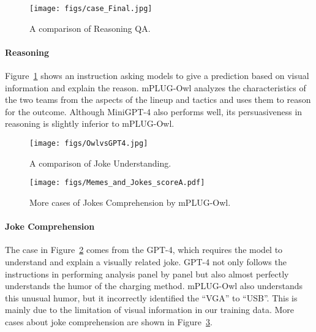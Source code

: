 \documentclass{article}
\newcommand{\modelname}{mPLUG-Owl\xspace}
\begin{document}
\begin{figure}[!ht]
    \centering
    \texttt{[image: figs/case\_Final.jpg]}
    \caption{A comparison of Reasoning QA.}
    \label{fig:case_Final}
    \vspace{-2mm}
\end{figure}

\paragraph{Reasoning}
Figure~\ref{fig:case_Final} shows an instruction asking models to give a prediction based on visual information and explain the reason. 
\modelname analyzes the characteristics of the two teams from the aspects of the lineup and tactics and uses them to reason for the outcome. Although MiniGPT-4 also performs well, its persuasiveness in reasoning is slightly inferior to \modelname.

\begin{figure}[!ht]
    \centering
    \texttt{[image: figs/OwlvsGPT4.jpg]}
    \caption{A comparison of Joke Understanding.}
    \label{fig:case_GPT4}
    \vspace{-2mm}
\end{figure}

\begin{figure}[!ht]
    \centering
    \texttt{[image: figs/Memes\_and\_Jokes\_scoreA.pdf]}
    \caption{More cases of Jokes Comprehension by \modelname.}
    \label{fig:Memes_and_Jokes_scoreA}
    \vspace{-2mm}
\end{figure}



\paragraph{Joke Comprehension}
The case in Figure~\ref{fig:case_GPT4} comes from the GPT-4\citep{gpt4}, which requires the model to understand and explain a visually related joke.
GPT-4 not only follows the instructions in performing analysis panel by panel but also almost perfectly understands the humor of the charging method. \modelname also understands this unusual humor, but it incorrectly identified the ``VGA'' to ``USB''. This is mainly due to the limitation of visual information in our training data. More cases about joke comprehension are shown in Figure~\ref{fig:Memes_and_Jokes_scoreA}.
\end{document}
